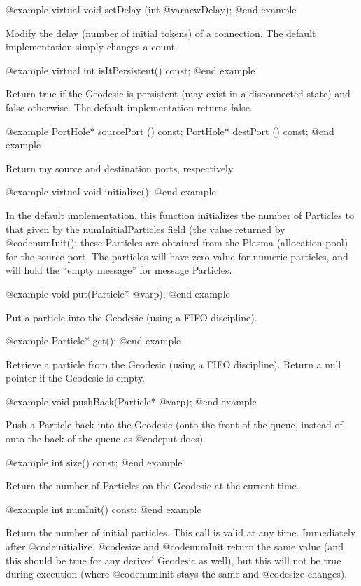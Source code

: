 @example
virtual void setDelay (int @var{newDelay});
@end example

Modify the delay (number of initial tokens) of a connection.  The
default implementation simply changes a count.

@example
virtual int isItPersistent() const;
@end example

Return true if the Geodesic is persistent (may exist in a disconnected
state) and false otherwise.  The default implementation returns false.

@example
PortHole* sourcePort () const;
PortHole* destPort () const;
@end example

Return my source and destination ports, respectively.

@example
virtual void initialize();
@end example

In the default implementation, this function initializes the number of
Particles to that given by the numInitialParticles field (the value
returned by @code{numInit()}; these Particles are obtained from the
Plasma (allocation pool) for the source port.  The particles will
have zero value for numeric particles, and will hold the ``empty message''
for message Particles.

@example
void put(Particle* @var{p});
@end example

Put a particle into the Geodesic (using a FIFO discipline).

@example
Particle* get();
@end example

Retrieve a particle from the Geodesic (using a FIFO discipline).
Return a null pointer if the Geodesic is empty.

@example
void pushBack(Particle* @var{p});
@end example

Push a Particle back into the Geodesic (onto the front of the queue,
instead of onto the back of the queue as @code{put} does).

@example
int size() const;
@end example

Return the number of Particles on the Geodesic at the current time.

@example
int numInit() const;
@end example

Return the number of initial particles.  This call is valid at any
time.  Immediately after @code{initialize}, @code{size} and
@code{numInit} return the same value (and this should be true for
any derived Geodesic as well), but this will not be true during
execution (where @code{numInit} stays the same and @code{size}
changes).

